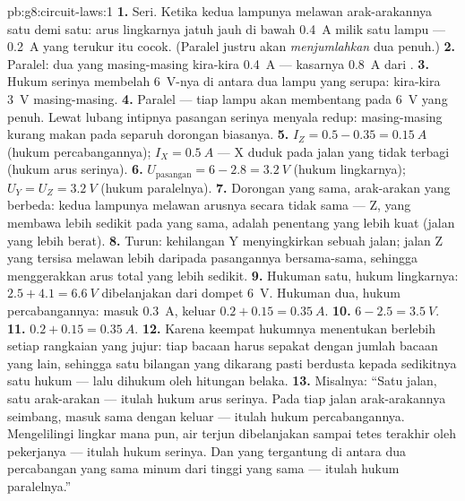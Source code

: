\begin{solution}{pb:g8:circuit-laws:1}
\textbf{1.} Seri. Ketika  kedua lampunya melawan
arak-arakannya satu demi satu: arus lingkarnya jatuh jauh di bawah
\qty{0.4}{A} milik satu lampu --- \qty{0.2}{A} yang terukur itu cocok.
(Paralel justru akan \emph{menjumlahkan} dua  penuh.)
\textbf{2.} Paralel: dua  yang masing-masing kira-kira
\qty{0.4}{A} --- kasarnya \qty{0.8}{A} dari .
\textbf{3.} Hukum  serinya membelah \qty{6}{V}-nya di antara
dua lampu yang serupa: kira-kira \qty{3}{V} masing-masing.
\textbf{4.} Paralel --- tiap lampu akan membentang pada \qty{6}{V}
yang penuh. Lewat lubang intipnya pasangan serinya menyala redup:
masing-masing kurang makan pada separuh dorongan biasanya.
\textbf{5.} $I_Z = 0.5 - 0.35 = \qty{0.15}{A}$ (hukum
percabangannya); $I_X = \qty{0.5}{A}$ --- X duduk pada jalan yang tidak
terbagi (hukum arus serinya).
\textbf{6.} $U_{\text{pasangan}} = 6 - 2.8 = \qty{3.2}{V}$ (hukum
lingkarnya); $U_Y = U_Z = \qty{3.2}{V}$ (hukum paralelnya).
\textbf{7.} Dorongan yang sama, arak-arakan yang berbeda: kedua
lampunya melawan arusnya secara tidak sama --- Z, yang membawa lebih
sedikit pada  yang sama, adalah penentang yang lebih kuat
(jalan yang lebih berat).
\textbf{8.} Turun: kehilangan  Y menyingkirkan sebuah jalan;
jalan Z yang tersisa melawan lebih daripada pasangannya bersama-sama,
sehingga  menggerakkan arus total yang lebih sedikit.
\textbf{9.} Hukuman satu, hukum lingkarnya: $2.5 + 4.1 =
\qty{6.6}{V}$ dibelanjakan dari dompet \qty{6}{V}. Hukuman dua,
hukum percabangannya: masuk \qty{0.3}{A}, keluar $0.2 + 0.15 =
\qty{0.35}{A}$.
\textbf{10.} $6 - 2.5 = \qty{3.5}{V}$.
\textbf{11.} $0.2 + 0.15 = \qty{0.35}{A}$.
\textbf{12.} Karena keempat hukumnya menentukan berlebih setiap
rangkaian yang jujur: tiap bacaan harus sepakat dengan jumlah bacaan
yang lain, sehingga satu bilangan yang dikarang pasti berdusta kepada
sedikitnya satu hukum --- lalu dihukum oleh hitungan belaka.
\textbf{13.} Misalnya: ``Satu jalan, satu arak-arakan --- itulah hukum
arus serinya. Pada tiap  jalan arak-arakannya seimbang, masuk
sama dengan keluar --- itulah hukum percabangannya. Mengelilingi
lingkar mana pun, air terjun  dibelanjakan sampai tetes
terakhir oleh pekerjanya --- itulah hukum  serinya. Dan 
yang tergantung di antara dua percabangan yang sama minum dari tinggi
yang sama --- itulah hukum  paralelnya.''
\end{solution}
